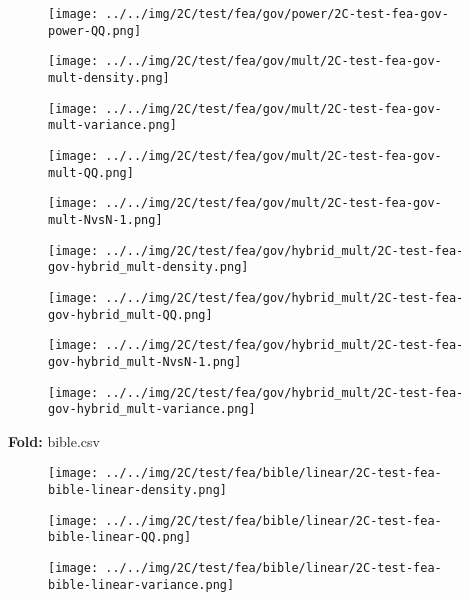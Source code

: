 \begin{figure}[H]
\centering	\texttt{[image: ../../img/2C/test/fea/gov/power/2C-test-fea-gov-power-QQ.png]}
\end{figure}
\begin{figure}[H]
\centering	\texttt{[image: ../../img/2C/test/fea/gov/mult/2C-test-fea-gov-mult-density.png]}
\end{figure}
\begin{figure}[H]
\centering	\texttt{[image: ../../img/2C/test/fea/gov/mult/2C-test-fea-gov-mult-variance.png]}
\end{figure}
\begin{figure}[H]
\centering	\texttt{[image: ../../img/2C/test/fea/gov/mult/2C-test-fea-gov-mult-QQ.png]}
\end{figure}
\begin{figure}[H]
\centering	\texttt{[image: ../../img/2C/test/fea/gov/mult/2C-test-fea-gov-mult-NvsN-1.png]}
\end{figure}
\begin{figure}[H]
\centering	\texttt{[image: ../../img/2C/test/fea/gov/hybrid\_mult/2C-test-fea-gov-hybrid\_mult-density.png]}
\end{figure}
\begin{figure}[H]
\centering	\texttt{[image: ../../img/2C/test/fea/gov/hybrid\_mult/2C-test-fea-gov-hybrid\_mult-QQ.png]}
\end{figure}
\begin{figure}[H]
\centering	\texttt{[image: ../../img/2C/test/fea/gov/hybrid\_mult/2C-test-fea-gov-hybrid\_mult-NvsN-1.png]}
\end{figure}
\begin{figure}[H]
\centering	\texttt{[image: ../../img/2C/test/fea/gov/hybrid\_mult/2C-test-fea-gov-hybrid\_mult-variance.png]}
\end{figure}
\textbf{Fold:} bible.csv
\begin{figure}[H]
\centering	\texttt{[image: ../../img/2C/test/fea/bible/linear/2C-test-fea-bible-linear-density.png]}
\end{figure}
\begin{figure}[H]
\centering	\texttt{[image: ../../img/2C/test/fea/bible/linear/2C-test-fea-bible-linear-QQ.png]}
\end{figure}
\begin{figure}[H]
\centering	\texttt{[image: ../../img/2C/test/fea/bible/linear/2C-test-fea-bible-linear-variance.png]}
\end{figure}
